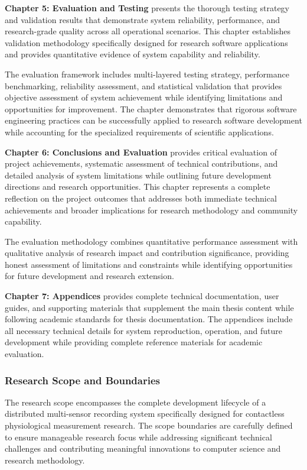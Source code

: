 \documentclass[11pt,a4paper]{article}
\begin{document}
\textbf{Chapter 5: Evaluation and Testing} presents the thorough testing strategy and validation results that
demonstrate system reliability, performance, and research-grade quality across all
operational scenarios.  This chapter
establishes validation methodology specifically designed for research software
applications and provides quantitative
evidence of system capability and reliability.

The evaluation framework includes multi-layered testing strategy, performance
benchmarking, reliability assessment, and
statistical validation that provides objective assessment of system achievement while
identifying limitations and
opportunities for improvement.  The chapter demonstrates that rigorous software
engineering practices can be successfully
applied to research software development while accounting for the specialized
requirements of scientific applications.

\textbf{Chapter 6: Conclusions and Evaluation} provides critical evaluation of project achievements, systematic assessment of
technical contributions, and detailed analysis of system limitations while outlining
future development directions
and research opportunities.  This chapter represents a complete reflection on the
project outcomes that addresses
both immediate technical achievements and broader implications for research
methodology and community capability.

The evaluation methodology combines quantitative performance assessment with
qualitative analysis of research impact and
contribution significance, providing honest assessment of limitations and constraints
while identifying opportunities
for future development and research extension.

\textbf{Chapter 7: Appendices} provides complete technical documentation, user guides, and supporting materials that
supplement the main thesis content while following academic standards for thesis
documentation.  The appendices include
all necessary technical details for system reproduction, operation, and future
development while providing complete
reference materials for academic evaluation.

\subsubsection{Research Scope and Boundaries}

The research scope encompasses the complete development lifecycle of a distributed
multi-sensor recording system
specifically designed for contactless physiological measurement research.  The scope
boundaries are carefully defined to
ensure manageable research focus while addressing significant technical challenges
and contributing meaningful
innovations to computer science and research methodology.
\end{document}
